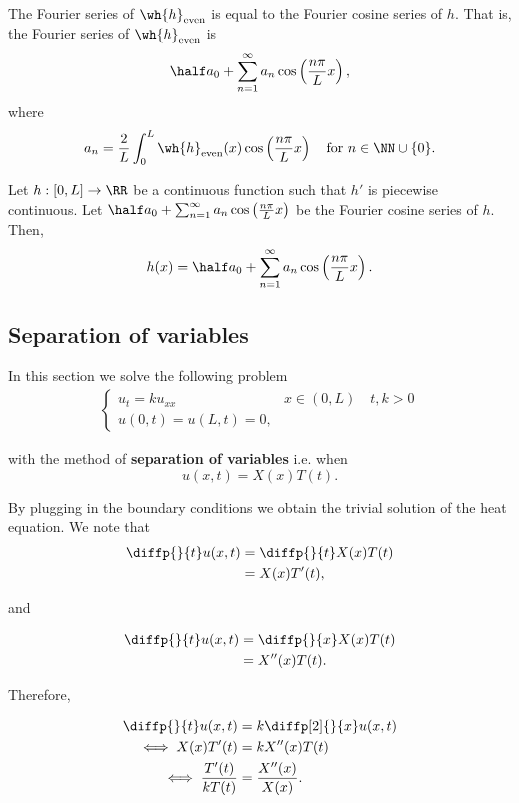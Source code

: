 \documentclass[12pt, a4paper]{article}
\begin{document}
\begin{proposition}
    The Fourier series of \(\wh{h}_{\text{even}}\) is equal to the Fourier cosine series of \(h\). That is, the Fourier series of \(\wh{h}_{\text{even}}\) is 
    \[\half a_0 + \sum_{n=1}^{\infty} a_n \cos\left( \frac{n\pi}{L}x \right),\]
    where 
    \[a_n =\frac{2}{L} \int_{0}^L \wh{h}_{\text{even}}(x) \cos\left( \frac{n\pi}{L}x \right) \quad \text{for } n \in \NN \cup \{0\}.\]
\end{proposition}

\begin{corollary}
    Let \(h:[0,L] \to \RR\) be a continuous function such that \(h'\) is piecewise continuous. Let \(\half a_0 +\sum_{n=1}^{\infty} a_n \cos\left( \frac{n\pi}{L}x \right)\) be the Fourier cosine series of \(h\). Then,
    \[h(x) = \half a_0 +\sum_{n=1}^{\infty} a_n \cos\left( \frac{n\pi}{L}x \right).\]
\end{corollary}

\subsection{Separation of variables}

In this section we solve the following problem 
\[\begin{aligned}
    \begin{cases}
        u_t=ku_{xx} & x\in(0,L) \quad t,k>0 \\
        u(0,t)=u(L,t)=0,
    \end{cases}
\end{aligned}\]

with the method of \textbf{separation of variables} i.e. when 
\[u(x,t) = X(x)T(t).\]

By plugging in the boundary conditions we obtain the trivial solution of the heat equation. We note that 
\[\begin{aligned}
    \diffp{}{t}u(x,t) &= \diffp{}{t} X(x)T(t) \\
    &= X(x)T'(t),
\end{aligned}\]

and 

\[\begin{aligned}
    \diffp{}{t}u(x,t) &= \diffp{}{x} X(x)T(t) \\
    &= X''(x)T(t).
\end{aligned}\]

Therefore, 

\[\begin{aligned}
    \diffp{}{t}u(x,t) &= k\diffp[2]{}{x}u(x,t) \\
    \iff X(x)T'(t) &= kX''(x)T(t) \\
    \iff \frac{T'(t)}{kT(t)} &= \frac{X''(x)}{X(x)}.
\end{aligned}\]
\end{document}
